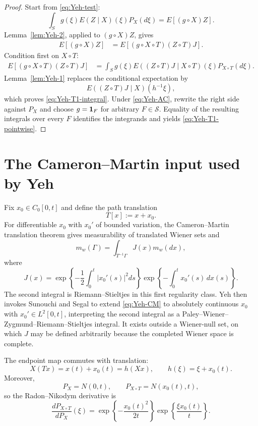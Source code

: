 \begin{proof}
Start from \eqref{eq:Yeh-test}:
\[
 \int_Sg(\xi)E(Z\mid X)(\xi)P_X(d\xi)
 =E[(g\circ X)Z].
\]
Lemma~\ref{lem:Yeh-2}, applied to $(g\circ X)Z$, gives
\begin{align*}
 E[(g\circ X)Z]
 &=E[(g\circ X\circ T)(Z\circ T)J].
\end{align*}
Condition first on $X\circ T$:
\begin{align*}
 E[(g\circ X\circ T)(Z\circ T)J]
 &=\int_Sg(\xi)
 E((Z\circ T)J\mid X\circ T)(\xi)
 P_{X\circ T}(d\xi).
\end{align*}
Lemma~\ref{lem:Yeh-1} replaces the conditional expectation by
\[
 E((Z\circ T)J\mid X)(h^{-1}\xi),
\]
which proves \eqref{eq:Yeh-T1-integral}.  Under \eqref{eq:Yeh-AC}, rewrite the right side against $P_X$ and choose $g=\mathbf{1}_F$ for arbitrary $F\in\mathcal S$.  Equality of the resulting integrals over every $F$ identifies the integrands and yields \eqref{eq:Yeh-T1-pointwise}.
\end{proof}

\section{The Cameron--Martin input used by Yeh}
Fix $x_0\in C_0[0,t]$ and define the path translation
\begin{equation}\label{eq:Yeh-T}
 T[x]:=x+x_0.
\end{equation}
For differentiable $x_0$ with $x_0'$ of bounded variation, the Cameron--Martin translation theorem gives measurability of translated Wiener sets and
\begin{equation}\label{eq:Yeh-CM}
 m_w(\Gamma)
 =\int_{T^{-1}\Gamma}J(x)m_w(dx),
\end{equation}
where
\begin{equation}\label{eq:Yeh-J}
 J(x)
 =\exp\left\{-\frac12\int_0^t|x_0'(s)|^2ds\right\}
  \exp\left\{-\int_0^tx_0'(s)\,dx(s)\right\}.
\end{equation}
The second integral is Riemann--Stieltjes in this first regularity class.  Yeh then invokes Sunouchi and Segal to extend \eqref{eq:Yeh-CM} to absolutely continuous $x_0$ with $x_0'\in L^2[0,t]$, interpreting the second integral as a Paley--Wiener--Zygmund--Riemann--Stieltjes integral.  It exists outside a Wiener-null set, on which $J$ may be defined arbitrarily because the completed Wiener space is complete.

The endpoint map commutes with translation:
\begin{equation}\label{eq:Yeh-h}
 X(Tx)=x(t)+x_0(t)=h(Xx),
 \qquad h(\xi)=\xi+x_0(t).
\end{equation}
Moreover,
\[
 P_X=N(0,t),
 \qquad
 P_{X\circ T}=N(x_0(t),t),
\]
so the Radon--Nikodym derivative is
\begin{equation}\label{eq:Yeh-ratio}
 \frac{dP_{X\circ T}}{dP_X}(\xi)
 =\exp\left\{-\frac{x_0(t)^2}{2t}\right\}
  \exp\left\{\frac{\xi x_0(t)}t\right\}.
\end{equation}

